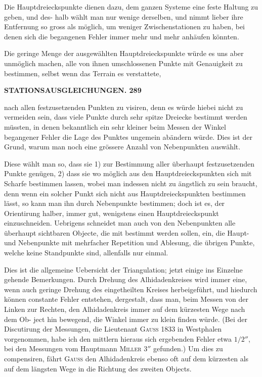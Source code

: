 \documentclass[12pt,a4paper]{article}
\theoremstyle{plain}
\theoremstyle{definition}
\theoremstyle{remark}
\begin{document}
Die Hauptdreieckspunkte dienen dazu, dem ganzen Systeme eine feste Haltung zu geben, und des-
halb w\"ahlt man nur wenige derselben, und nimmt lieber ihre Entfernung so gross als m\"oglich, um weniger
Zwischenstationen zu haben, bei denen sich die begangenen Fehler immer mehr und mehr anh\"aufen k\"onnten.

Die geringe Menge der ausgew\"ahlten Hauptdreieckspunkte w\"urde es uns aber unm\"oglich machen,
alle von ihnen umschlossenen Punkte mit Genauigkeit zu bestimmen, selbst wenn das Terrain es verstattete,


\newpage

\noindent\textbf{STATIONSAUSGLEICHUNGEN. 289}

nach allen festzusetzenden Punkten zu visiren, denn es w\"urde hiebei nicht zu vermeiden sein, dass viele
Punkte durch sehr spitze Dreiecke bestimmt werden m\"ussten, in denen bekanntlich ein sehr kleiner beim
Messen der Winkel begangener Fehler die Lage des Punktes ungemein ab\"andern w\"urde. Dies ist der
Grund, warum man noch eine gr\"ossere Anzahl von Nebenpunkten ausw\"ahlt.

Diese w\"ahlt man so, dass sie 1) zur Bestimmung aller \"uberhaupt festzusetzenden Punkte gen\"ugen,
2) dass sie wo m\"oglich aus den Hauptdreieckspunkten sich mit Scharfe bestimmen lassen, wobei man
indessen nicht zu \"angstlich zu sein braucht, denn wenn ein solcher Punkt sich nicht aus Hauptdreieckspunkten
bestimmen l\"asst, so kann man ihn durch Nebenpunkte bestimmen; doch ist es, der Orientirung halber,
immer gut, wenigstens einen Hauptdreieckspunkt einzuschneiden. Uebrigens schneidet man auch von den
Nebenpunkten alle \"uberhaupt sichtbaren Objecte, die mit bestimmt werden sollen, ein, die Haupt-
und Nebenpunkte mit mehrfacher Repetition und Ablesung, die \"ubrigen Punkte, welche keine Standpunkte
sind, allenfalls nur einmal.

Dies ist die allgemeine Uebersicht der Triangulation; jetzt einige ins Einzelne gehende Bemerkungen.
Durch Drehung des Alhidadenkreises wird immer eine, wenn auch geringe Drehung des eingetheilten
Kreises herbeigef\"uhrt, und hiedurch k\"onnen constante Fehler entstehen, dergestalt, dass man, beim
Messen von der Linken zur Rechten, den Alhidadenkreis immer auf dem k\"urzesten Wege nach dem Ob-
ject hin bewegend, die Winkel immer zu klein finden w\"urde. (Bei der Discutirung der Messungen, die
Lieutenant \textsc{Gauss} 1833 in Westphalen vorgenommen, habe ich den mittlern hieraus sich ergebenden Fehler
etwa $1/2''$, bei den Messungen vom Hauptmann \textsc{Miller} $3''$ gefunden.) Um dies zu compensiren, f\"ahrt
\textsc{Gauss} den Alhidadenkreis ebenso oft auf dem k\"urzesten als auf dem l\"angsten Wege in die Richtung des
zweiten Objects.
\end{document}
